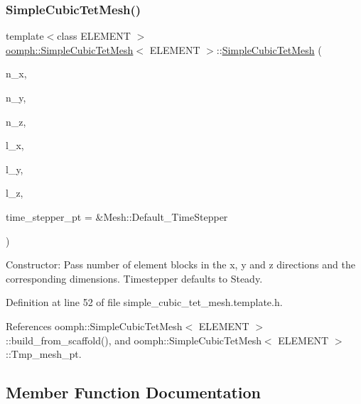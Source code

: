 \subsubsection{\texorpdfstring{Simple\+Cubic\+Tet\+Mesh()}{SimpleCubicTetMesh()}}
{\footnotesize\ttfamily template$<$class E\+L\+E\+M\+E\+NT $>$ \\
\hyperlink{classoomph_1_1SimpleCubicTetMesh}{oomph\+::\+Simple\+Cubic\+Tet\+Mesh}$<$ E\+L\+E\+M\+E\+NT $>$\+::\hyperlink{classoomph_1_1SimpleCubicTetMesh}{Simple\+Cubic\+Tet\+Mesh} (\begin{DoxyParamCaption}\item[{const unsigned \&}]{n\+\_\+x,  }\item[{const unsigned \&}]{n\+\_\+y,  }\item[{const unsigned \&}]{n\+\_\+z,  }\item[{const double \&}]{l\+\_\+x,  }\item[{const double \&}]{l\+\_\+y,  }\item[{const double \&}]{l\+\_\+z,  }\item[{Time\+Stepper $\ast$}]{time\+\_\+stepper\+\_\+pt = {\ttfamily \&Mesh\+:\+:Default\+\_\+TimeStepper} }\end{DoxyParamCaption})\hspace{0.3cm}{\ttfamily [inline]}}



Constructor\+: Pass number of element blocks in the x, y and z directions and the corresponding dimensions. Timestepper defaults to Steady. 



Definition at line 52 of file simple\+\_\+cubic\+\_\+tet\+\_\+mesh.\+template.\+h.



References oomph\+::\+Simple\+Cubic\+Tet\+Mesh$<$ E\+L\+E\+M\+E\+N\+T $>$\+::build\+\_\+from\+\_\+scaffold(), and oomph\+::\+Simple\+Cubic\+Tet\+Mesh$<$ E\+L\+E\+M\+E\+N\+T $>$\+::\+Tmp\+\_\+mesh\+\_\+pt.



\subsection{Member Function Documentation}
\mbox{\label{classoomph_1_1SimpleCubicTetMesh_a558c1fcc4bd91cdb2830977df2171537}} 
